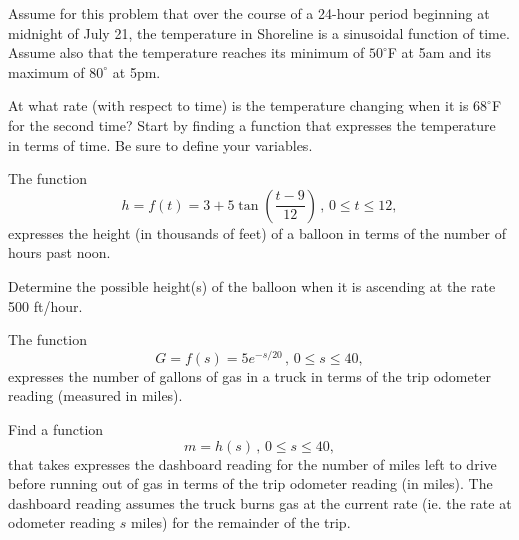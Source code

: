 \documentclass{ximera}
\begin{document}
\begin{question} \label{Qggey5ghhtt}
Assume for this problem that over the course of a 24-hour period beginning at midnight of July 21, the temperature in Shoreline is a sinusoidal function of time. Assume also that the temperature reaches its minimum of $50^\circ$F at 5am and its maximum of $80^\circ$ at 5pm.

At what rate (with respect to time) is the temperature changing when it is $68^\circ$F for the second time? Start by finding a function that expresses the temperature in terms of time. Be sure to define your variables.
\end{question}

\begin{question} \label{Qdcgbfghbbnb}
The function
\[
     h = f(t) = 3+5 \tan \left( \frac{t-9}{12}\right) \, , \,  0\leq t\leq 12 ,
\]
expresses the height (in thousands of feet) of a balloon in terms of the number of hours past noon.

Determine the possible height(s) of the balloon when it is ascending at the rate 500 ft/hour.
\end{question}

\begin{question}  \label{Q45nbhbgnfgn}
The function
\[
       G = f(s) = 5 e^{-s/20} \, , \, 0\leq s \leq 40,
\]
expresses the number of gallons of gas in a truck in terms of the trip odometer reading (measured in miles).

Find a function
\[
          m = h(s) \, , \, 0\leq s \leq 40,
\]
that takes expresses the dashboard reading for the number of miles left to drive before running out of gas in terms of the trip odometer reading (in miles). The dashboard reading assumes the truck burns gas at the current rate (ie. the rate at odometer reading $s$ miles) for the remainder of the trip. 
\end{question}
\end{document}
